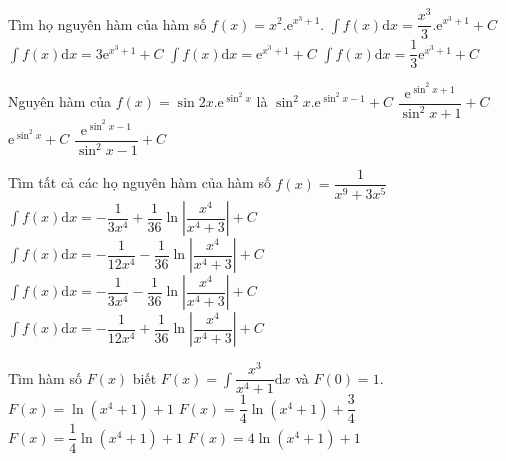 \begin{ex}
	Tìm họ nguyên hàm của hàm số $ f(x)=x^2.\mathrm{e}^{x^3+1}$.
	\choice
	{$\displaystyle\int{f(x)\mathrm{d}x=}\dfrac{x^3}{3}.\mathrm{e}^{x^3+1}+C$}
	{$\displaystyle\int{f(x)\mathrm{d}x=}3\mathrm{e}^{x^3+1}+C$}
	{$\displaystyle\int{f(x)\mathrm{d}x=}{\mathrm{e}^{x^3+1}}+C$}
	{\True $\displaystyle\int{f(x)\mathrm{d}x=}\dfrac{1}{3}{\mathrm{e}^{x^3+1}}+C$}
\end{ex}
\begin{ex}
	Nguyên hàm của $ f(x)=\sin 2x.\mathrm{e}^{\sin^2x}$ là
	\choice
	{$\sin^2x.\mathrm{e}^{\sin^2x-1}+C$}
	{$\dfrac{\mathrm{e}^{\sin^2x+1}}{\sin^2x+1}+C$}
	{\True $\mathrm{e}^{\sin^2x}+C$}
	{$\dfrac{\mathrm{e}^{\sin^2x-1}}{\sin^2x-1}+C$}
\end{ex}
\begin{ex}
	Tìm tất cả các họ nguyên hàm của hàm số $ f(x)=\dfrac{1}{x^9+3x^5}$
	\choice
	{$\displaystyle\int{f(x)\mathrm{d}x=-\dfrac{1}{3x^4}+\dfrac{1}{36}\ln\left|\dfrac{x^4}{x^4+3}\right|+C}$}
	{\True $\displaystyle\int{f(x)\mathrm{d}x=-\dfrac{1}{{12}{x^4}}-\dfrac{1}{36}\ln\left|\dfrac{x^4}{x^4+3}\right|+C}$}
	{$\displaystyle\int{f(x)\mathrm{d}x=-\dfrac{1}{3x^4}-\dfrac{1}{36}\ln\left|\dfrac{x^4}{x^4+3}\right|+C}$}
	{$\displaystyle\int{f(x)\mathrm{d}x=-\dfrac{1}{{12}{x^4}}+\dfrac{1}{36}\ln\left|\dfrac{x^4}{x^4+3}\right|+C}$}
\end{ex}
\begin{ex}
	Tìm hàm số $F(x)$ biết $F(x)=\displaystyle\int{\dfrac{x^3}{x^4+1}\mathrm{d}x}$ và $F(0)=1$.
	\choice
	{$ F(x)=\ln\left(x^4+1\right)+1$}
	{$ F(x)=\dfrac{1}{4}\ln\left(x^4+1\right)+\dfrac{3}{4}$}
	{\True $ F(x)=\dfrac{1}{4}\ln\left(x^4+1\right)+1$}
	{$ F(x)=4\ln\left(x^4+1\right)+1$}
\end{ex}
